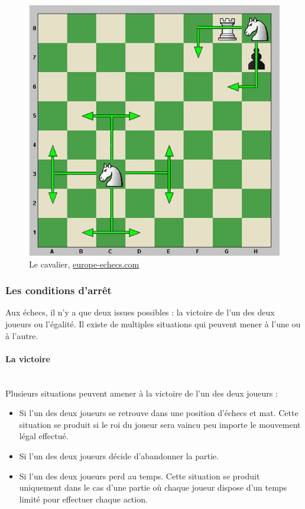 \huge\documentclass{article}
\begin{document}
\begin{figure}[h]
\centering
\includegraphics[scale=0.5]{img/mouvements_cavalier.jpg}
\caption{Le cavalier,
\href{https://www.europe-echecs.com/art/2-le-deplacement-des-pieces-93.html}{europe-echecs.com}}
\end{figure}


\subsubsection{Les conditions d'arrêt}\label{condition d'arret}

Aux échecs, il n'y a que deux issues possibles : la victoire de l'un des deux joueurs ou l'égalité. Il existe de multiples situations qui peuvent mener à l'une ou à l'autre.

\paragraph{La victoire}
~~\\

Plusieurs situations peuvent amener à la victoire de l'un des deux joueurs :
\newline

\begin{itemize}
    \item Si l'un des deux joueurs se retrouve dans une position d'échecs et mat. Cette situation se produit si le roi du joueur sera vaincu peu importe le mouvement légal effectué.
    \item Si l'un des deux joueurs décide d'abandonner la partie.
    \item Si l'un des deux joueurs perd au temps. Cette situation se produit uniquement dans le cas d'une partie où chaque joueur dispose d'un temps limité pour effectuer chaque action.
\end{itemize}
\end{document}
